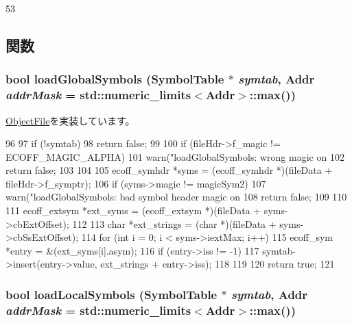 \begin{DoxyCode}
53 {}
\end{DoxyCode}


\subsection{関数}
\hypertarget{classEcoffObject_a1de102f86bbb53d20455d9e78be53935}{
\subsubsection[{loadGlobalSymbols}]{\setlength{\rightskip}{0pt plus 5cm}bool loadGlobalSymbols (SymbolTable $\ast$ {\em symtab}, \/  {\bf Addr} {\em addrMask} = {\ttfamily std::numeric\_\-limits$<${\bf Addr}$>$::max()})}}
\label{classEcoffObject_a1de102f86bbb53d20455d9e78be53935}


\hyperlink{classObjectFile_abd8b86c98494f055ba7e0babbd55f4a0}{ObjectFile}を実装しています。


\begin{DoxyCode}
96 {
97     if (!symtab)
98         return false;
99 
100     if (fileHdr->f_magic != ECOFF_MAGIC_ALPHA) {
101         warn("loadGlobalSymbols: wrong magic on %
102         return false;
103     }
104 
105     ecoff_symhdr *syms = (ecoff_symhdr *)(fileData + fileHdr->f_symptr);
106     if (syms->magic != magicSym2) {
107         warn("loadGlobalSymbols: bad symbol header magic on %
108         return false;
109     }
110 
111     ecoff_extsym *ext_syms = (ecoff_extsym *)(fileData + syms->cbExtOffset);
112 
113     char *ext_strings = (char *)(fileData + syms->cbSsExtOffset);
114     for (int i = 0; i < syms->iextMax; i++) {
115         ecoff_sym *entry = &(ext_syms[i].asym);
116         if (entry->iss != -1)
117             symtab->insert(entry->value, ext_strings + entry->iss);
118     }
119 
120     return true;
121 }
\end{DoxyCode}
\hypertarget{classEcoffObject_aab9393b89c15838ac1b842e642f981bb}{
\subsubsection[{loadLocalSymbols}]{\setlength{\rightskip}{0pt plus 5cm}bool loadLocalSymbols (SymbolTable $\ast$ {\em symtab}, \/  {\bf Addr} {\em addrMask} = {\ttfamily std::numeric\_\-limits$<${\bf Addr}$>$::max()})}}
\label{classEcoffObject_aab9393b89c15838ac1b842e642f981bb}


